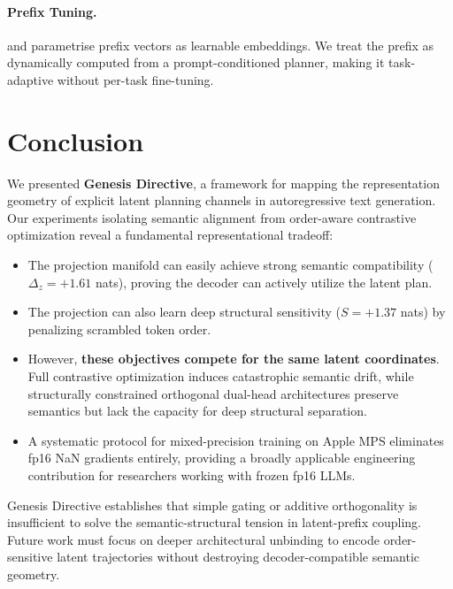 \documentclass[11pt]{article}
\begin{document}
\paragraph{Prefix Tuning.}
\citet{li2021prefix} and \citet{lester2021power} parametrise prefix vectors as
learnable embeddings.
We treat the prefix as dynamically computed from a prompt-conditioned planner,
making it task-adaptive without per-task fine-tuning.

\section{Conclusion}
\label{sec:conclusion}

We presented \textbf{Genesis Directive}, a framework for mapping the representation geometry of explicit latent planning channels in autoregressive text generation. Our experiments isolating semantic alignment from order-aware contrastive optimization reveal a fundamental representational tradeoff:

\begin{itemize}
  \item The projection manifold can easily achieve strong semantic compatibility ($\Delta_z = +1.61$ nats), proving the decoder can actively utilize the latent plan.
  \item The projection can also learn deep structural sensitivity ($S = +1.37$ nats) by penalizing scrambled token order.
  \item However, \textbf{these objectives compete for the same latent coordinates}. Full contrastive optimization induces catastrophic semantic drift, while structurally constrained orthogonal dual-head architectures preserve semantics but lack the capacity for deep structural separation.
  \item A systematic protocol for mixed-precision training on Apple MPS eliminates fp16 NaN gradients entirely, providing a broadly applicable engineering contribution for researchers working with frozen fp16 LLMs.
\end{itemize}

Genesis Directive establishes that simple gating or additive orthogonality is insufficient to solve the semantic-structural tension in latent-prefix coupling. Future work must focus on deeper architectural unbinding to encode order-sensitive latent trajectories without destroying decoder-compatible semantic geometry.
\end{document}
